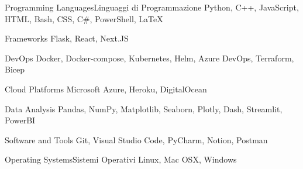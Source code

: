 

\begin{cvskills}

\cvskill
{\fi}
{\fi} %

\cvskill
{\ifenglish Programming Languages\else Linguaggi di Programmazione\fi}
{Python, C++, JavaScript, HTML, Bash, CSS, C\#, PowerShell, LaTeX}


\cvskill
{Frameworks} %
{Flask, React, Next.JS} %

\cvskill
{DevOps} %
{Docker, Docker-compose, Kubernetes, Helm, Azure DevOps, Terraform, Bicep} %

\cvskill
{Cloud Platforms} %
{Microsoft Azure, Heroku, DigitalOcean} %

\cvskill
{Data Analysis} %
{Pandas, NumPy, Matplotlib, Seaborn, Plotly, Dash, Streamlit, PowerBI} %


\cvskill
{Software and Tools} %
{Git, Visual Studio Code, PyCharm, Notion, Postman} %


\cvskill
{\ifenglish Operating Systems\else Sistemi Operativi\fi} %
{Linux, Mac OSX, Windows} %


\end{cvskills}